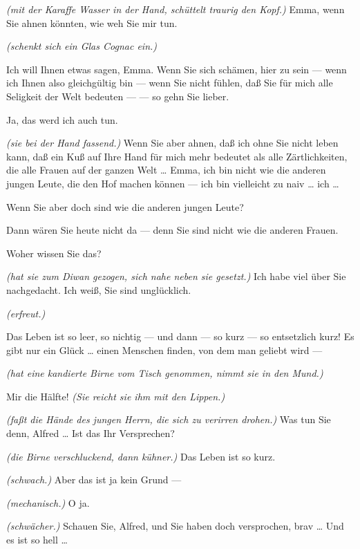 \documentclass[
	final,
	a4paper,
	ngerman,
	mpinclude = true, %
	twoside = true,
	open = right,
	cleardoublepage = plain,
	DIV = 13,
	BCOR = 1cm,
	titlepage = firstiscover,
	]{scrbook}
\newcommand{\direction}[1]{\textit{(#1)}}
\newcommand{\thecharacter}[1]{\textup{\textsc{#1}}}
\newcommand{\theherr}{\thecharacter{Junger Herr}}
\newcommand{\thefrau}{\thecharacter{Junge Frau}}
\newcommand{\character}[1]{\item[#1:]}
\newcommand{\herr}{\character{\theherr}}
\newcommand{\frau}{\character{\thefrau}}
\begin{document}
\begin{play}
	\herr
	\direction{mit der Karaffe Wasser in der Hand, schüttelt traurig den Kopf.} Emma, wenn Sie ahnen könnten, wie weh Sie mir tun.

	\frau
	\direction{schenkt sich ein Glas Cognac ein.}

	\herr
	Ich will Ihnen etwas sagen, Emma. Wenn Sie sich schämen, hier zu sein --- wenn ich Ihnen also gleichgültig bin --- wenn Sie nicht fühlen, daß Sie für mich alle Seligkeit der Welt bedeuten --- --- so gehn Sie lieber.

	\frau
	Ja, das werd ich auch tun.

	\herr
	\direction{sie bei der Hand fassend.} Wenn Sie aber ahnen, daß ich ohne Sie nicht leben kann, daß ein Kuß auf Ihre Hand für mich mehr bedeutet als alle Zärtlichkeiten, die alle Frauen auf der ganzen Welt \ldots{} Emma, ich bin nicht wie die anderen jungen Leute, die den Hof machen können --- ich bin vielleicht zu naiv \ldots{} ich \ldots{}

	\frau
	Wenn Sie aber doch sind wie die anderen jungen Leute?

	\herr
	Dann wären Sie heute nicht da --- denn Sie sind nicht wie die anderen Frauen.

	\frau
	Woher wissen Sie das?

	\herr
	\direction{hat sie zum Diwan gezogen, sich nahe neben sie gesetzt.} Ich habe viel über Sie nachgedacht. Ich weiß, Sie sind unglücklich.

	\frau
	\direction{erfreut.}

	\herr
	Das Leben ist so leer, so nichtig --- und dann --- so kurz --- so entsetzlich kurz! Es gibt nur ein Glück \ldots{} einen Menschen finden, von dem man geliebt wird ---

	\frau
	\direction{hat eine kandierte Birne vom Tisch genommen, nimmt sie in den Mund.}

	\herr
	Mir die Hälfte! \direction{Sie reicht sie ihm mit den Lippen.}

	\frau
	\direction{faßt die Hände des jungen Herrn, die sich zu verirren drohen.} Was tun Sie denn, Alfred \ldots{} Ist das Ihr Versprechen?

	\herr
	\direction{die Birne verschluckend, dann kühner.} Das Leben ist so kurz.

	\frau
	\direction{schwach.} Aber das ist ja kein Grund ---

	\herr
	\direction{mechanisch.} O ja.

	\frau
	\direction{schwächer.} Schauen Sie, Alfred, und Sie haben doch versprochen, brav \ldots{} Und es ist so hell \ldots{}


\end{play}
\end{document}
